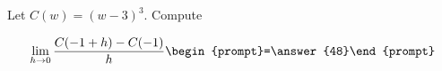 \documentclass{ximera}
\author{Bart Snapp}
\begin{document}
\begin{exercise}
Let $C(w) = (w-3)^3$. Compute

\[
\lim_{ h\to 0 } \frac{C(-1+h)-C(-1)}{h} \begin{prompt}=\answer{48}\end{prompt}
\]
\end{exercise}
\end{document}
